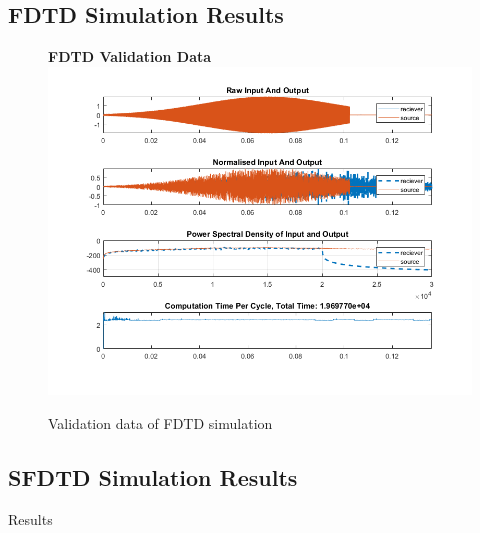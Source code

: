 \subsection{FDTD Simulation Results}

\begin{figure}[H]
\centering
\textbf{FDTD Validation Data}
  \includegraphics[width=\textwidth]{./graphics/FDTDvalidationFinal.png}
  \caption{Validation data of FDTD simulation}
\end{figure}

\subsection{SFDTD Simulation Results}

Results

